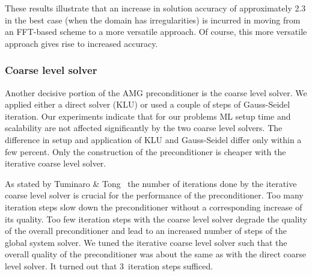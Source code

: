 \documentclass[a4paper,10pt,3p,final,pdftex]{elsarticle}
\begin{document}

These results illustrate that an increase in solution accuracy of approximately
2.3 in the best case (when the domain has irregularities) is incurred in moving
from an FFT-based scheme to a more versatile approach. Of course, this more
versatile approach gives rise to increased accuracy.

\subsubsection*{Coarse level solver}

Another decisive portion of the AMG preconditioner is the coarse level
solver.  We applied either a direct solver (KLU) or used a couple of
steps of Gauss-Seidel iteration.  
Our experiments indicate that for our problems ML setup time and scalability are
not affected significantly by the two coarse level solvers. The difference in
setup and application of KLU and Gauss-Seidel  differ only within a few
percent. Only the construction of the preconditioner is cheaper with the
iterative coarse level solver.  

As stated by Tuminaro \& Tong~\cite{tuto:00} the number of iterations
done by the iterative coarse level solver is crucial for the performance of the
preconditioner.  Too many iteration steps slow down the preconditioner without a
corresponding increase of its quality.  Too
few iteration steps with the coarse level solver degrade the quality of
the overall preconditioner and lead to an increased number of steps of
the global system solver.  We tuned the iterative coarse level solver
such that the overall quality of the preconditioner was about the same
as with the direct coarse level solver.  It turned out that 3~iteration
steps sufficed.

\end{document}
